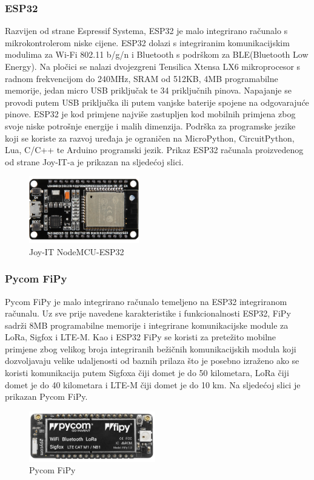 \documentclass[times, utf8, diplomski]{fer}
\begin{document}
\subsubsection{ESP32}
Razvijen od strane Espressif Systema, ESP32\citep{ESP32} je malo integrirano računalo s mikrokontrolerom niske cijene. ESP32 dolazi s integriranim komunikacijskim modulima za Wi-Fi 802.11 b/g/n i Bluetooth s podrškom za BLE(Bluetooth Low Energy). Na pločici se nalazi dvojezgreni Tensilica Xtensa LX6 mikroprocesor s radnom frekvencijom do 240MHz, SRAM od 512KB, 4MB programabilne memorije, jedan micro USB priključak te 34 priključnih pinova. Napajanje se provodi putem USB priključka ili putem vanjske baterije spojene na odgovarajuće pinove. ESP32 je kod primjene najviše zastupljen kod mobilnih primjena zbog svoje niske potrošnje energije i malih dimenzija. Podrška za programske jezike koji se koriste za razvoj uređaja je ograničen na  MicroPython, CircuitPython, Lua, C/C++ te Arduino programski jezik. Prikaz ESP32 računala proizvedenog od strane Joy-IT-a je prikazan na sljedećoj slici.
\begin{figure}[H]
    \centering
    \includegraphics[width=4.8cm]{images/esp32.png}
    \caption{Joy-IT NodeMCU-ESP32\citep{ESP32Img}}
    \label{fig:esp32}
\end{figure}

\subsubsection{Pycom FiPy}
Pycom FiPy\citep{Fipy} je malo integrirano računalo temeljeno na ESP32 integriranom računalu. Uz sve prije navedene karakteristike i funkcionalnosti ESP32, FiPy sadrži 8MB programabilne memorije i integrirane komunikacijske module za LoRa, Sigfox i LTE-M. Kao i ESP32 FiPy se koristi za pretežito mobilne primjene zbog velikog broja integriranih bežičnih komunikacijskih modula koji dozvoljavaju velike udaljenosti od baznih prilaza što je posebno izraženo ako se koristi komunikacija putem Sigfoxa čiji domet je do 50 kilometara, LoRa čiji domet je do 40 kilometara i LTE-M čiji domet je do 10 km. Na sljedećoj slici je prikazan Pycom FiPy.
\begin{figure}[htb]
    \centering
    \includegraphics[width=5.5cm]{images/fipy.png}
    \caption{Pycom FiPy\citep{Fipy}}
    \label{fig:fipy}
\end{figure}
\end{document}
